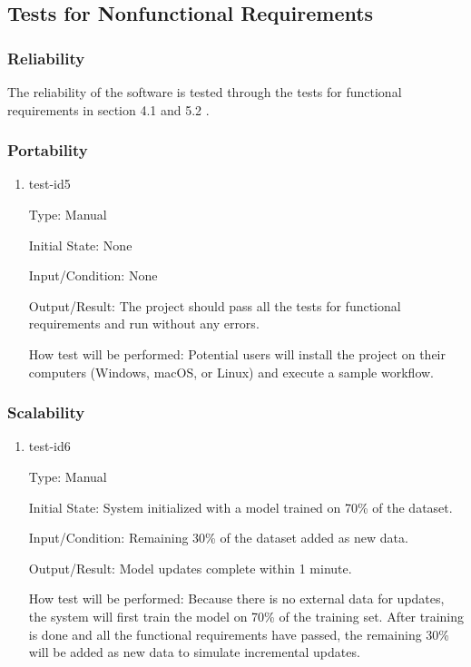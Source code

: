 \documentclass[12pt, titlepage]{article}
\begin{document}
\subsection{Tests for Nonfunctional Requirements}

\subsubsection{Reliability}

The reliability of the software is tested through the tests for
functional requirements in section 4.1 and 5.2 .

\subsubsection{Portability}

\begin{enumerate}

\item{test-id5\\}

Type: Manual
					
Initial State: None
					
Input/Condition: None
					
Output/Result: The project should pass all the tests for functional requirements and run without any errors.

How test will be performed: Potential users will install the project on their computers (Windows, macOS, or Linux) and execute a sample workflow. 
\end{enumerate}


\subsubsection{Scalability}

\begin{enumerate}

\item{test-id6\\}

Type: Manual

Initial State: System initialized with a model trained on 70\% of the dataset.

Input/Condition: Remaining 30\% of the dataset added as new data.

Output/Result: Model updates complete within 1 minute.

How test will be performed: Because there is no external data for updates, the system will first train the model on 70\% of the training set. After training is done and all the functional requirements have passed, the remaining 30\% will be added as new data to simulate incremental updates.


\end{enumerate}
\end{document}
